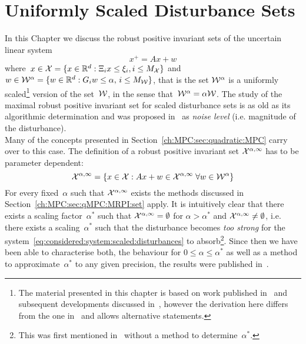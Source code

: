 \resetcounters
\chapter{Uniformly Scaled Disturbance Sets}\label{ch:MPC:sec:scaled:sets}
%
%
%
%
%
\mysplit In this Chapter we discuss the robust positive invariant sets of the uncertain linear system
%
\begin{equation}\label{eq:considered:system:scaled:disturbances}
	x^+ = Ax + w
\end{equation}
%
where~$x\in\mathcal X = \{x\in\mathbb R^d:\Xi_i x\leq \xi_i, i\leq M_\mathcal X\}$ and $w\in\mathcal W^\alpha = \{w\in\mathbb R^d:G_iw\leq \alpha,\,i\leq M_\mathcal W\}$, that is the set $\mathcal W^\alpha$ is a uniformly scaled\footnote{%
%
The material presented in this chapter is based on work published in~\cite{Schaich:2015} and subsequent developments discussed in~\cite{Schulze-Darup:2016}, however the derivation here differs from the one in~\cite{Schulze-Darup:2016} and allows alternative statements.
%
} version of the set~$\mathcal W$, in the sense that~$\mathcal W^\alpha=\alpha\mathcal W$.
%
The study of the maximal robust positive invariant set for scaled disturbance sets is as old as its algorithmic determination and was proposed in~\cite{Kolmanovsky:1995} as \emph{noise level} (i.e. magnitude of the disturbance).
%
\\[1em]
%
Many of the concepts presented in Section~\ref{ch:MPC:sec:quadratic:MPC} carry over to this case.
%
The definition of a robust positive invariant set $\mathcal X^{\alpha,\infty}$ has to be parameter dependent:
%
\begin{equation}
	\mathcal X^{\alpha,\infty} = \{x\in\mathcal X:Ax+w\in\mathcal X^{\alpha,\infty}\;\forall w\in\mathcal W^\alpha\}
\end{equation}
%
For every fixed~$\alpha$ such that $\mathcal X^{\alpha,\infty}$ exists the methods discussed in Section~\ref{ch:MPC:sec:qMPC:MRPI:set} apply.
%
It is intuitively clear that there exists a scaling factor~$\alpha^\ast$ such that $\mathcal X^{\alpha,\infty}=\emptyset$ for $\alpha>\alpha^\ast$ and $\mathcal X^{\alpha,\infty}\neq\emptyset$, i.e. there exists a scaling~$\alpha^\ast$ such that the disturbance becomes \emph{too strong} for the system~\eqref{eq:considered:system:scaled:disturbances} to absorb\footnote{This was first mentioned in~\cite{Kolmanovsky:1998} without a method to determine~$\alpha^\ast$.}.
%
Since then we have been able to characterise both, the behaviour for $0\leq\alpha\leq\alpha^\ast$ as well as a method to approximate~$\alpha^\ast$ to any given precision, the results were published in~\cite{Schaich:2015,Schulze-Darup:2016}.
